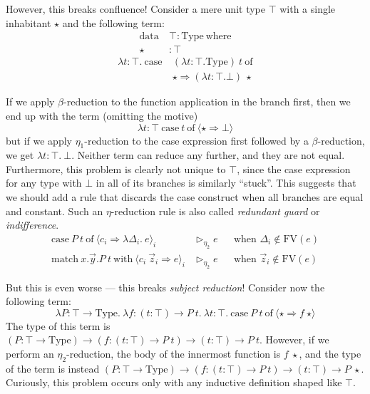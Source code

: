 \documentclass{report}
\newcommand{\const}[1]{\text{#1}}
\newcommand{\meta}[1]{\text{#1}}
\newcommand{\data}{\const{data}}
\newcommand{\Type}{\const{Type}}
\newcommand{\where}{\const{where}}
\newcommand{\case}{\const{case}}
\newcommand{\of}{\const{of}}
\newcommand{\match}{\const{match}}
\newcommand{\with}{\const{with}}
\begin{document}
However, this breaks confluence! Consider a mere unit type $\top$ with a single inhabitant $\star$ and the following term:
%
\begin{align*}
    \data ~ &\top: \Type ~ \where \\
    \star &: \top
\end{align*}
\begin{align*}
    \lambda t: \top. ~ \case ~ &(\lambda t: \top. \Type) ~ t ~ \of \\
    &\star \Rightarrow (\lambda t: \top. \bot) ~ \star
\end{align*}

If we apply $\beta$-reduction to the function application in the branch first, then we end up with the term (omitting the motive) $$\lambda t: \top ~ \case ~ t ~ \of ~ \langle \star \Rightarrow \bot \rangle$$ but if we apply $\eta_1$-reduction to the case expression first followed by a $\beta$-reduction, we get $\lambda t: \top. ~ \bot$. Neither term can reduce any further, and they are not equal. Furthermore, this problem is clearly not unique to $\top$, since the case expression for any type with $\bot$ in all of its branches is similarly ``stuck''. This suggests that we should add a rule that discards the case construct when all branches are equal and constant. Such an $\eta$-reduction rule is also called \emph{redundant guard} or \emph{indifference}.
%
\begin{align*}
    \case ~ P ~ t ~ \of ~ \langle c_i \Rightarrow \lambda \Delta_i. ~ e \rangle_i &\rhd_{\eta_2} e && \text{when $\Delta_i \notin \meta{FV}(e)$} \\
    \match ~ x.\Vec{y}.P ~ t ~ \with ~ \langle c_i ~ \Vec{z}_i \Rightarrow e \rangle_i &\rhd_{\eta_2} e && \text{when $\Vec{z}_i \notin \meta{FV}(e)$}
\end{align*}

But this is even worse --- this breaks \emph{subject reduction}! Consider now the following term:
$$\lambda P: \top \to \Type. ~ \lambda f: (t: \top) \to P ~ t. ~ \lambda t: \top. ~ \case ~ P ~ t ~ \of ~ \langle \star \Rightarrow f ~ \star \rangle$$
The type of this term is $(P: \top \to \Type) \to (f: (t: \top) \to P ~ t) \to (t: \top) \to P ~ t$. However, if we perform an $\eta_2$-reduction, the body of the innermost function is $f ~ \star$, and the type of the term is instead $(P: \top \to \Type) \to (f: (t: \top) \to P ~ t) \to (t: \top) \to P ~ \star$. Curiously, this problem occurs only with any inductive definition shaped like $\top$.
\end{document}
